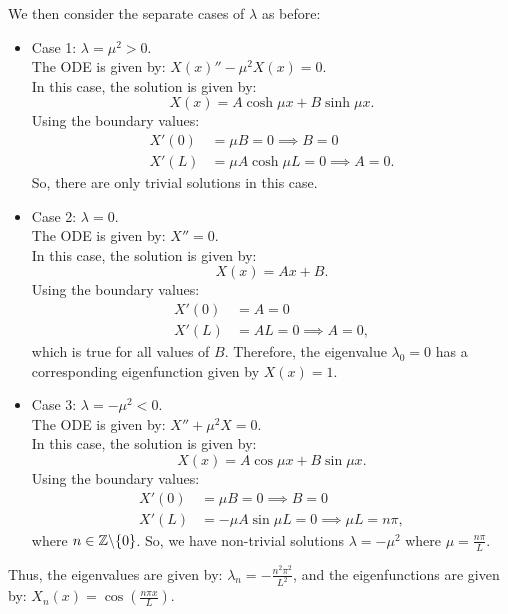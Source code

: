 We then consider the separate cases of $\lambda$ as before:
\begin{itemize}
	\item Case 1: $\lambda = \mu^2 > 0$.\\
	The ODE is given by: $X(x)'' - \mu^2 X(x) = 0$.\\
	In this case, the solution is given by:
	\[
	X(x) = A \cosh{\mu x} + B \sinh{\mu x}.
	\]
	Using the boundary values:
	\begin{align*}
		X'(0) &= \mu B = 0 \implies B=0 \\
		X'(L) &= \mu A \cosh{\mu L} = 0 \implies A=0.
	\end{align*}
	So, there are only trivial solutions in this case.
	
	\item Case 2: $\lambda = 0$.\\
	The ODE is given by: $X''= 0$.\\
	In this case, the solution is given by:
	\[
	X(x) = Ax + B.
	\]
	Using the boundary values:
	\begin{align*}
		X'(0) &= A = 0 \\
		X'(L) &= AL = 0 \implies A = 0,
	\end{align*}
	which is true for all values of $B$. Therefore, the eigenvalue $\lambda_0 = 0$ has a corresponding eigenfunction given by $X(x) = 1$.
	
	\item Case 3: $\lambda = -\mu^2 < 0$.\\
	The ODE is given by: $X'' + \mu^2 X = 0$.\\
	In this case, the solution is given by:
	\[
	X(x) = A \cos{\mu x} + B \sin{\mu x}.
	\]
	Using the boundary values:
	\begin{align*}
		X'(0) &= \mu B = 0 \implies B = 0 \\
		X'(L) &= -\mu A \sin{\mu L} = 0 \implies \mu L = n \pi,
	\end{align*}
	where $n \in \mathbb{Z} \backslash \{0\} $. So, we have non-trivial solutions $\lambda = -\mu^2$ where $\mu = \frac{n \pi}{L}$.
\end{itemize}
Thus, the eigenvalues are given by: $\lambda_n = -\frac{n^2\pi^2}{L^2}$, and the eigenfunctions are given by: $X_n(x) = \cos{\left(\frac{n \pi x}{L} \right)}$.

